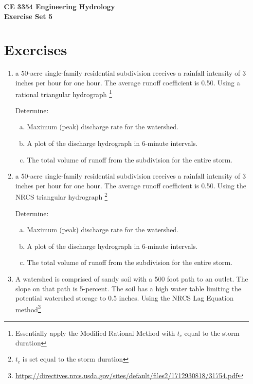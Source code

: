 \documentclass[12pt]{article}
\begin{document}
\begin{center}
{\textbf{{ CE 3354 Engineering Hydrology} \\ {Exercise Set 5}}}
\end{center}

\section*{\small{Exercises}}

\begin{enumerate}

\item a 50-acre single-family residential subdivision receives a rainfall intensity of 3 inches per hour for one hour.  The average runoff coefficient is 0.50.  Using a rational triangular hydrograph \footnote{Essentially apply the Modified Rational Method with $t_c$ equal to the storm duration} 

Determine:
    \begin{enumerate}[a)]
        \item Maximum (peak) discharge rate for the watershed.
        \item A plot of the discharge hydrograph in 6-minute intervals.
        \item The total volume of runoff from the subdivision for the entire storm.
    \end{enumerate}

\clearpage

\item a 50-acre single-family residential subdivision receives a rainfall intensity of 3 inches per hour for one hour.  The average runoff coefficient is 0.50.  Using the NRCS triangular hydrograph \footnote{$t_c$ is set equal to the storm duration} 

Determine:
    \begin{enumerate}[a)]
        \item Maximum (peak) discharge rate for the watershed.
        \item A plot of the discharge hydrograph in 6-minute intervals.
        \item The total volume of runoff from the subdivision for the entire storm.
    \end{enumerate}

\clearpage

\item A watershed is comprised of sandy soil with a 500 foot path to an outlet.  The slope on that path is 5-percent.  The soil has a high water table limiting the potential watershed storage to 0.5 inches.  Using the NRCS Lag Equation method\footnote{\url{https://directives.nrcs.usda.gov/sites/default/files2/1712930818/31754.pdf}}


\end{enumerate}
\end{document}
